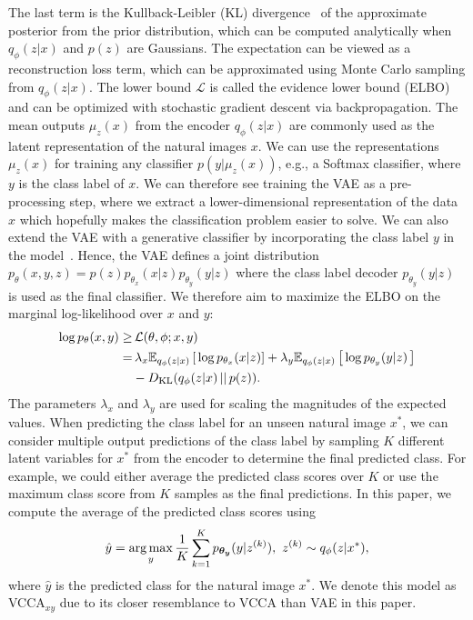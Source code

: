 The last term is the Kullback-Leibler (KL) divergence~ of the approximate posterior from the prior distribution, which can be computed analytically when $q_{\phi}(z|x)$ and $p(z)$ are Gaussians. The expectation can be viewed as a reconstruction loss term, which can be approximated using Monte Carlo sampling from $q_{\phi}(z|x)$. The lower bound $\mathcal{L}$ is called the evidence lower bound (ELBO) and can be optimized with stochastic gradient descent via backpropagation. The mean outputs $\mu_{z}(x)$ from the encoder $q_{\phi}(z|x)$ are commonly used as the latent representation of the natural images $x$. We can use the representations
$\mu_{z}(x)$ for training any classifier $p(y | \mu_{z}(x))$, e.g., a Softmax classifier, where $y$ is the class label of $x$. We can therefore see training the VAE as a pre-processing step, where we extract a lower-dimensional representation of the data $x$ which hopefully makes the classification problem easier to solve. 
We can also extend the VAE with a generative classifier by incorporating the class label $y$ in the model~. 
Hence, the VAE defines a joint distribution $p_{\theta}(x, y, z) = p(z) p_{\theta_{x}}(x|z) p_{\theta_{y}}(y|z)$ where the class label decoder $p_{\theta_{y}}(y|z)$ is used as the final classifier. 
We therefore aim to maximize the ELBO on the marginal log-likelihood over $x$ and $y$: 
\begin{align}\label{eq:loss_vcca_xy}
    \begin{split}
        \log p_{\theta}(x, y) \geq & \, \mathcal{L}(\theta, \phi; x, y) \\ 
        = & \,  \lambda_{x} \mathbb{E}_{q_{\phi}(z|x)}\left[\, \log p_{\theta_{x}}(x | z) \right] + \lambda_{y} \mathbb{E}_{q_{\phi}(z|x)}\left[\, \log p_{\theta_{y}}(y | z) \,\right] \\ 
        & - D_{\mathrm{KL}}(q_{\phi}(z|x)\,||\,p(z)) .
    \end{split}
\end{align}  
The parameters $\lambda_{x}$ and $\lambda_{y}$ are used for scaling the magnitudes of the expected values. When predicting the class label for an unseen natural image $x^{*}$, we can consider multiple output predictions of the class label by sampling $K$ different latent variables for $x^{*}$ from the encoder to determine the final predicted class. For example, we could either average the predicted class scores over $K$ or use the maximum class score from $K$ samples as the final predictions. In this paper, we compute the average of the predicted class scores using
\begin{align}\label{eq:prediction_vcca_xy}
    \hat{y} = \operatorname*{arg\,max}_{y} \frac{1}{K} \sum_{k=1}^{K} p_{\bm{\theta_{y}}}(y | z^{(k)}), \,\, z^{(k)} \sim q_{\phi}(z | x^{*}) ,
\end{align}
where $\hat{y}$ is the predicted class for the natural image $x^{*}$. We denote this model as VCCA$_{x y}$ due to its closer resemblance to VCCA than VAE in this paper.


